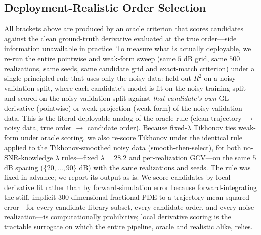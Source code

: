 \documentclass[review,3p,times]{elsarticle}
\begin{document}
\subsection{Deployment-Realistic Order Selection}
\label{sec:realistic}
All brackets above are produced by an oracle criterion that scores candidates against the clean ground-truth derivative evaluated at the true order---side information unavailable in practice. To measure what is actually deployable, we re-run the entire pointwise and weak-form sweep (same $5$ dB grid, same $500$ realizations, same seeds, same candidate grid and exact-match criterion) under a single principled rule that uses only the noisy data: held-out $R^2$ on a noisy validation split, where each candidate's model is fit on the noisy training split and scored on the noisy validation split against \emph{that candidate's own} GL derivative (pointwise) or weak projection (weak-form) of the noisy validation data. This is the literal deployable analog of the oracle rule (clean trajectory $\to$ noisy data, true order $\to$ candidate order). Because fixed-$\lambda$ Tikhonov ties weak-form under oracle scoring, we also re-score Tikhonov under the identical rule applied to the Tikhonov-smoothed noisy data (smooth-then-select), for both no-SNR-knowledge $\lambda$ rules---fixed $\lambda = 28.2$ and per-realization GCV---on the same $5$ dB spacing ($\{20,\dots,90\}$ dB) with the same realizations and seeds. The rule was fixed in advance; we report its output as-is. We score candidates by local derivative fit rather than by forward-simulation error because forward-integrating the stiff, implicit $300$-dimensional fractional PDE to a trajectory mean-squared error---for every candidate library subset, every candidate order, and every noise realization---is computationally prohibitive; local derivative scoring is the tractable surrogate on which the entire pipeline, oracle and realistic alike, relies.
\end{document}
